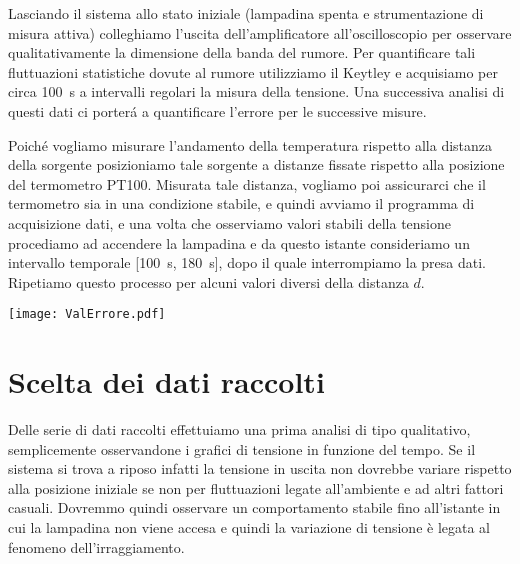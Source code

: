 \documentclass[
    rmp,
    reprint, 
    superscriptaddress, 
    altaffilletter, 
    amsmath, 
    amssymb,
    a4paper]{revtex4-2}
\begin{document}
Lasciando il sistema allo stato iniziale (lampadina spenta e strumentazione di misura attiva) colleghiamo l'uscita dell'amplificatore all'oscilloscopio per osservare qualitativamente la dimensione della banda del rumore. 
Per quantificare tali fluttuazioni statistiche dovute al rumore utilizziamo il Keytley e acquisiamo per circa \SI{100}{\second} a intervalli regolari la misura della tensione. Una successiva analisi di questi dati ci porter\'a a quantificare l'errore per le successive misure.

Poiché vogliamo misurare l'andamento della temperatura rispetto alla distanza della sorgente posizioniamo tale sorgente a distanze fissate rispetto alla posizione del termometro PT100. Misurata tale distanza, vogliamo poi assicurarci che il termometro sia in una condizione stabile, e quindi avviamo il programma di acquisizione dati, e una volta che osserviamo valori stabili della tensione procediamo ad accendere la lampadina e da questo istante consideriamo un intervallo temporale [\SI{100}{\second}, \SI{180}{\second}], dopo il quale interrompiamo la presa dati. Ripetiamo questo processo per alcuni valori diversi della distanza $d$.

\begin{figure*}
    \texttt{[image: ValErrore.pdf]}
    \caption{Per la valutazione dell'errore abbiamo raccolto alcuni dati lasciando la strumentazione in tensione e la sorgente spenta. Questi dati, nel grafico in alto a destra (Dati pre-analisi V(t)) mostrano un comportamento riconducibile ad un segnale sinusoidale a bassa frequenza, e la relativa distribuzione, nell'istogramma (Dati pre-analisi), non è infatti riconducibile ad una curva gaussiana come atteso per una distribuzione di probabilità legata all'errore. In basso a destra (Dati senza componente V(t)) invece troviamo i dati trattati sottraendo la componente periodica di segnale, mostra un comportamento che non è imputabile alla presenza di segnali periodici. Infatti la relativa distribuzione è ben più simile ad una distribuzione gaussiana, come osserviamo a sinistra in rosso.}
    \label{fig:errore}
\end{figure*}

\section*{Scelta dei dati raccolti}
Delle serie di dati raccolti effettuiamo una prima analisi di tipo qualitativo, semplicemente osservandone i grafici di tensione in funzione del tempo. Se il sistema si trova a riposo infatti la tensione in uscita non dovrebbe variare rispetto alla posizione iniziale se non per fluttuazioni legate all'ambiente e ad altri fattori casuali. Dovremmo quindi osservare un comportamento stabile fino all'istante in cui la lampadina non viene accesa e quindi la variazione di tensione è legata al fenomeno dell'irraggiamento. 
\end{document}
